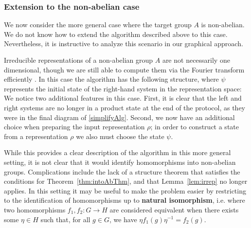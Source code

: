 \subsubsection*{Extension to the non-abelian case}
We now consider the more general case where the target group $A$ is non-abelian. We do not know how to extend the algorithm described above to this case.  Nevertheless, it is instructive to analyze this scenario in our graphical approach. 

Irreducible representations of a non-abelian group $A$ are not necessarily one dimensional, though we are still able to compute them via the Fourier transform efficiently \cite{childs2010quantum}. In this case the algorithm has the following structure, where $\psi$ represents the initial state of the right-hand system in the representation space:
\begin{equation}
\label{eq:NonAbAlg}

\end{equation}
We notice two additional features in this case. First, it is clear that the left and right systems are no longer in a product state at the end of the protocol, as they were in the final diagram of \eqref{simplifyAlg}. Second, we now have an additional choice when preparing the input representation $\rho$; in order to construct a state from a representation $\rho$ we also must choose the state $\psi$.

While this provides a clear description of the algorithm in this more general setting, it is not clear that it would identify homomorphisms into non-abelian groups. Complications include the lack of a structure theorem that satisfies the conditions for Theorem~\ref{thm:intoAbThm}, and that Lemma~\ref{lem:irrep} no longer applies.  In this setting it may be useful to make the problem easier by restricting to the identification of homomorphisms up to \textbf{natural isomorphism}, i.e. where two homomorphisms $f_1,f_2:G\to H$ are considered equivalent when there exists some $\eta\in H$ such that, for all $g\in G$, we have $\eta f_1(g) \eta^{-1} = f_2(g)$.


\newpage
